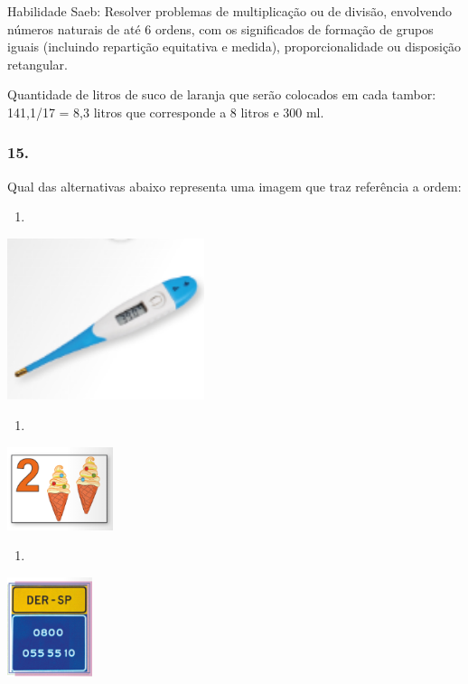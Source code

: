 Habilidade Saeb: Resolver problemas de multiplicação ou de divisão,
envolvendo números naturais de até 6 ordens, com os significados de
formação de grupos iguais (incluindo repartição equitativa e medida),
proporcionalidade ou disposição retangular.

Quantidade de litros de suco de laranja que serão colocados em cada
tambor: 141,1/17 = 8,3 litros que corresponde a 8 litros e 300 ml.

\subsubsection{15.}\label{section-156}

Qual das alternativas abaixo representa uma imagem que traz referência a
ordem:

\begin{enumerate}
\def\labelenumi{\alph{enumi})}
\item
\end{enumerate}

\includegraphics[width=2.27516in,height=1.85833in]{media/image148.png}

\begin{enumerate}
\def\labelenumi{\alph{enumi})}
\item
\end{enumerate}

\includegraphics[width=1.21677in,height=0.95842in]{media/image149.png}

\begin{enumerate}
\def\labelenumi{\alph{enumi})}
\item
\end{enumerate}

\includegraphics[width=0.98342in,height=1.15010in]{media/image150.png}

